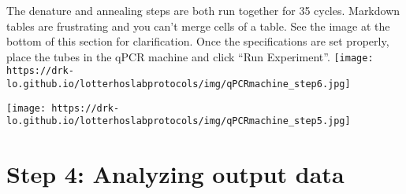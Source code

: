 \documentclass[
  letterpaper,
  DIV=11,
  numbers=noendperiod]{scrreprt}
\begin{document}
The denature and annealing steps are both run together for 35 cycles.
Markdown tables are frustrating and you can't merge cells of a table.
See the image at the bottom of this section for clarification. Once the
specifications are set properly, place the tubes in the qPCR machine and
click ``Run Experiment''.
\texttt{[image: https://drk-lo.github.io/lotterhoslabprotocols/img/qPCRmachine\_step6.jpg]}

\texttt{[image: https://drk-lo.github.io/lotterhoslabprotocols/img/qPCRmachine\_step5.jpg]}

\hypertarget{step-4-analyzing-output-data}{%
\section*{\texorpdfstring{\textbf{Step 4: Analyzing output
data}}{Step 4: Analyzing output data}}\label{step-4-analyzing-output-data}}
\end{document}
